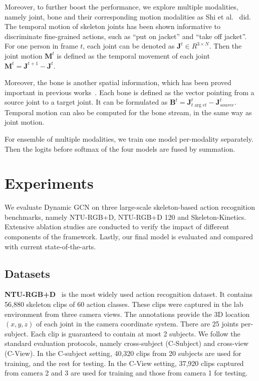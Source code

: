 \documentclass[sigconf]{acmart}
\begin{document}
Moreover, to further boost the performance, we explore multiple modalities, namely joint, bone and their corresponding motion modalities as Shi et al.~\cite{shi2019,shi2019two} did.
The temporal motion of skeleton joints has been shown informative to discriminate fine-grained actions, such as ``put on jacket'' and ``take off jacket''. For one person in frame $t$, each joint can be denoted as ${{\mathbf{J}}^t} \in {R^{3 \times N}}$. Then the joint motion $\mathbf{M}^t$ is defined as the temporal movement of each joint ${{\mathbf{M}}^t} = {{\mathbf{J}}^{t + 1}} - {{\mathbf{J}}^t}$.

Moreover, the bone is another spatial information, which has been proved important in previous works~\cite{shi2019two}. Each bone is defined as the vector pointing from a source joint to a target joint. It can be formulated as ${{\mathbf{B}}^t} = {\mathbf{J}}_{t\arg et}^t - {\mathbf{J}}_{source}^t$. Temporal motion can also be computed for the bone stream, in the same way as joint motion.

For ensemble of multiple modalities, we train one model per-modality separately. Then the logits before softmax of the four models are fused by summation.

\section{Experiments}
We evaluate Dynamic GCN on three large-scale skeleton-based action recognition benchmarks, namely NTU-RGB+D, NTU-RGB+D 120 and Skeleton-Kinetics. Extensive ablation studies are conducted to verify the impact of different components of the framework. Lastly, our final model is evaluated and compared with current state-of-the-arts.


\subsection{Datasets}


\noindent\textbf{NTU-RGB+D}~\cite{shahroudy} is the most widely used action recognition dataset. It contains 56,880 skeleton clips of 60 action classes. These clips were captured in the lab environment from three camera views. The annotations provide the 3D location $(x, y, z)$ of each joint in the camera coordinate system. There are 25 joints per-subject. Each clip is guaranteed to contain at most 2 subjects. We follow the standard evaluation protocols, namely cross-subject (C-Subject) and cross-view (C-View). In the C-subject setting, 40,320 clips from 20 subjects are used for training, and the rest for testing. In the C-View setting, 37,920 clips captured from camera 2 and 3 are used for training and those from camera 1 for testing.
\end{document}
